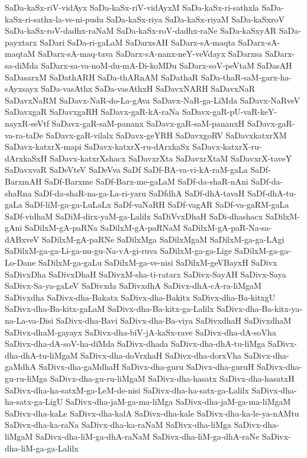 {SaDa-kaSx-riV-vidAyx
SaDa-kaSx-riV-vidAyxM
SaDa-kaSx-ri-sathxla
SaDa-kaSx-ri-sathx-la-ve-ni-pudu
SaDa-kaSx-riya
SaDa-kaSx-riyaM
SaDa-kaSxroV
SaDa-kaSx-roV-dadhx-raNaM
SaDa-kaSx-roV-dadhx-raNe
SaDa-kaSxyAR
SaDa-payxtarx
SaDari
SaDa-ri-gaLaM
SaDarxsAH
SaDarx-sA-maqta
SaDarx-sA-maqtaM
SaDarx-sA-maq-tava
SaDarx-sA-nanx-neY-veVdayx
SaDarxsa
SaDarx-sa-diMda
SaDarx-sa-va-noM-du-mA-Di-koMDu
SaDarx-soV-peVtaM
SaDasAH
SaDasarxM
SaDathARH
SaDa-thARnAM
SaDathaR
SaDa-thaR-saM-garx-ha-sAyxsayx
SaDa-vasAthx
SaDa-vasAthxH
SaDavxNARH
SaDavxNaR
SaDavxNaRM
SaDavx-NaR-do-La-gAva
SaDavx-NaR-ga-LiMda
SaDavx-NaRveV
SaDavxgaR
SaDavxgaRH
SaDavx-gaR-kA-raNa
SaDavx-gaR-pU-vaR-keY-nayxR-seVtf
SaDavx-gaR-saM-pananx
SaDavx-gaR-saM-pananxH
SaDavx-gaR-va-ra-taDe
SaDavx-gaR-vilalx
SaDavx-geYRH
SaDavxgoRV
SaDavxkatxrXM
SaDavx-katxrX-mapi
SaDavx-katxrX-ru-dArxkaSx
SaDavx-katxrX-ru-dArxkaSxH
SaDavx-katxrXshacx
SaDavxrXta
SaDavxrXtaM
SaDavxrX-taveY
SaDavxvaR
SaDeVteV
SaDeVva
SaDf
SaDf-BA-va-vi-kA-raM-gaLa
SaDf-BarxmAH
SaDf-Barxme
SaDf-Barx-me-gaLaM
SaDf-da-shaR-nAni
SaDf-da-shaRna
SaDf-da-shaR-na-ga-La-ri-yaru
SaDfdhA
SaDf-dhA-tavaH
SaDf-dhA-tu-gaLa
SaDf-liM-ga-ga-LuLaLx
SaDf-vaNaRH
SaDf-vagAR
SaDf-va-gaRM-gaLa
SaDf-vidhaM
SaDiM-dirx-yaM-ga-Lalilx
SaDiVvxDhaH
SaDi-dhashacx
SaDilxM-gAni
SaDilxM-gA-paRNa
SaDilxM-gA-paRNaM
SaDilxM-gA-paR-Na-sa-dABxveV
SaDilxM-gA-paRNe
SaDilxMga
SaDilxMgaM
SaDilxM-ga-ga-LAgi
SaDilxM-ga-ga-Li-ga-nu-gu-Na-vA-gi-ruva
SaDilxM-ga-ga-Lige
SaDilxM-ga-ga-Lo-Dane
SaDilxM-ga-gaLu
SaDilxM-ga-ve-nisi
SaDilxM-geVBayxH
SaDivx
SaDivxDha
SaDivxDhaH
SaDivxM-sha-ti-ratarx
SaDivx-SayAH
SaDivx-Saya
SaDivx-Sa-ya-gaLeV
SaDivxda
SaDivxdhA
SaDivx-dhA-cA-ra-liMgaM
SaDivxdha
SaDivx-dha-Bakatx
SaDivx-dha-Bakitx
SaDivx-dha-Ba-kitxgU
SaDivx-dha-Ba-kitx-gaLaM
SaDivx-dha-Ba-kitx-ga-Lalilx
SaDivx-dha-Ba-kitx-ya-na-La-va-Disi
SaDivx-dha-Bavi
SaDivx-dha-Ba-viya
SaDivxdhaH
SaDivxdhaM
SaDivx-dhaM-gayayx
SaDivx-dha-biV-jA-kaSx-rave
SaDivx-dha-dA-soVha
SaDivx-dha-dA-soV-ha-diMda
SaDivx-dhada
SaDivx-dha-dhA-tu-liMga
SaDivx-dha-dhA-tu-liMgaM
SaDivx-dha-doVrxhaH
SaDivx-dha-dorxVha
SaDivx-dha-gaMdhA
SaDivx-dha-gaMdhaH
SaDivx-dha-guru
SaDivx-dha-guruH
SaDivx-dha-gu-ru-liMga
SaDivx-dha-gu-ru-liMgaM
SaDivx-dha-hasatx
SaDivx-dha-hasatxH
SaDivx-dha-ha-satxM-ga-LeM-de-nisi
SaDivx-dha-ha-satx-ga-Lalilx
SaDivx-dha-ha-satx-ga-LigU
SaDivx-dha-jaM-ga-ma-liMga
SaDivx-dha-jaM-ga-ma-liMgaM
SaDivx-dha-kaLe
SaDivx-dha-kalA
SaDivx-dha-kale
SaDivx-dha-ka-le-ya-nAMtu
SaDivx-dha-ka-raNa
SaDivx-dha-ka-raNaM
SaDivx-dha-liMga
SaDivx-dha-liMgaM
SaDivx-dha-liM-ga-dhA-raNaM
SaDivx-dha-liM-ga-dhA-raNe
SaDivx-dha-liM-ga-ga-Lalilx
}
